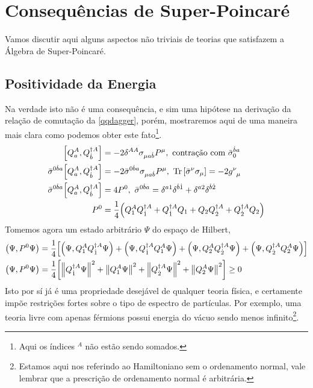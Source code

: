 \section{Consequências de Super-Poincaré}

Vamos discutir aqui alguns aspectos não triviais de teorias que satisfazem a Álgebra de Super-Poincaré.
\subsection{Positividade da Energia}

Na verdade isto não é uma consequência, e sim uma hipótese na derivação da relação de comutação 
da \cref{qqdagger}, porém, mostraremos aqui de uma maneira mais clara como podemos obter este fato\footnote{Aqui os índices $^A$ não estão sendo somados.}.
\begin{align*}
    \comm{Q^A_a}{Q^{\dagger A}_{\dot b}}&=-2\delta^{AA}\sigma_{\mu a\dot b}P^\mu,\ \textnormal{contração com }{\bar\sigma}^{\dot b a}_0\\
    {\bar\sigma}^{0\dot b a}\comm{Q^A_a}{Q^{\dagger A}_{\dot b}}&=-2{\bar\sigma}^{0\dot b a}\sigma_{\mu a\dot b}P^\mu,\ \Tr\qty[{\bar\sigma}^\nu\sigma_\mu]=-2\tensor{g}{^\nu_\mu}\\
    {\bar\sigma}^{0\dot b a}\comm{Q^A_a}{Q^{\dagger A}_{\dot b}}&=4P^0,\ {\bar\sigma}^{0\dot b a}=\delta^{a1}\delta^{\dot b\dot 1}+\delta^{a2}\delta^{\dot b\dot 2}\\
    P^0&=\frac14\qty(Q_1^AQ^{\dagger A}_{\dot 1}+Q^{\dagger A}_{\dot 1}Q_1+Q_2Q^{\dagger A}_{\dot 2}+Q^{\dagger A}_{\dot 2}Q_2)
\end{align*}
Tomemos agora um estado arbitrário $\Psi$ do espaço de Hilbert,
\begin{align*}
    \qty(\Psi,P^0\Psi)&=\frac14\qty[\qty(\Psi,Q_1^AQ^{\dagger A}_{\dot 1}\Psi)+\qty(\Psi,Q^{\dagger A}_{\dot 1}Q_1^A\Psi)+\qty(\Psi,Q_2^AQ^{\dagger A}_{\dot 2}\Psi)+\qty(\Psi,Q^{\dagger A}_{\dot 2}Q_2^A\Psi)]\\
    \qty(\Psi,P^0\Psi)&=\frac14\qty[\norm{Q^{\dagger A}_{\dot 1}\Psi}^2+\norm{Q_1^A\Psi}^2+\norm{Q^{\dagger A}_{\dot 2}\Psi}^2+\norm{Q_2^A\Psi}^2]\geq 0
\end{align*}
Isto por sí já é uma propriedade desejável de qualquer teoria física, e certamente impõe restrições fortes 
sobre o tipo de espectro de partículas. Por exemplo, uma teoria livre com apenas férmions possui energia do 
vácuo sendo menos infinito\footnote{Estamos aqui nos referindo ao Hamiltoniano sem o ordenamento normal, vale 
lembrar que a prescrição de ordenamento normal é arbitrária.}. 
